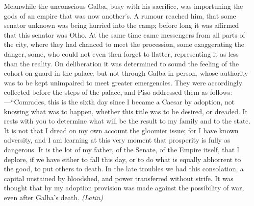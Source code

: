 Meanwhile the unconscious Galba, busy with his sacrifice, was importuning the gods of an empire that was now another's. A rumour reached him, that some senator unknown was being hurried into the camp; before long it was affirmed that this senator was Otho. At the same time came messengers from all parts of the city, where they had chanced to meet the procession, some exaggerating the danger, some, who could not even then forget to flatter, representing it as less than the reality. On deliberation it was determined to sound the feeling of the cohort on guard in the palace, but not through Galba in person, whose authority was to be kept unimpaired to meet greater emergencies. They were accordingly collected before the steps of the palace, and Piso addressed them as follows:—``Comrades, this is the sixth day since I became a Caesar by adoption, not knowing what was to happen, whether this title was to be desired, or dreaded. It rests with you to determine what will be the result to my family and to the state. It is not that I dread on my own account the gloomier issue; for I have known adversity, and I am learning at this very moment that prosperity is fully as dangerous. It is the lot of my father, of the Senate, of the Empire itself, that I deplore, if we have either to fall this day, or to do what is equally abhorrent to the good, to put others to death. In the late troubles we had this consolation, a capital unstained by bloodshed, and power transferred without strife. It was thought that by my adoption provision was made against the possibility of war, even after Galba's death. \emph{(Latin)}


